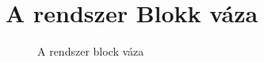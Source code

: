 \section{A rendszer Blokk váza}
\begin{figure}[H]
    \centering
    \caption{A rendszer block váza}
    \label{fig:blockDiagramm}
\end{figure}
